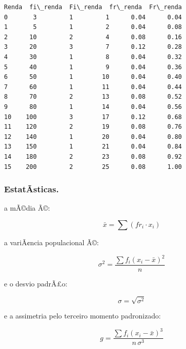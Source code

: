 ﻿\documentclass[11pt]{article}
\makeatletter
\newcommand{\boxspacing}{\kern\kvtcb@left@rule\kern\kvtcb@boxsep}
\newcommand{\prompt}[4]{
        {\ttfamily\llap{{\color{#2}[#3]:\hspace{3pt}#4}}\vspace{-\baselineskip}}
    }
\makeatother
\begin{document}
            \begin{tcolorbox}[breakable, size=fbox, boxrule=.5pt, pad at break*=1mm, opacityfill=0]
\prompt{Out}{outcolor}{20}{\boxspacing}
\begin{Verbatim}[commandchars=\\\{\}]
    Renda  fi\_renda  Fi\_renda  fr\_renda  Fr\_renda
0       3         1         1      0.04      0.04
1       5         1         2      0.04      0.08
2      10         2         4      0.08      0.16
3      20         3         7      0.12      0.28
4      30         1         8      0.04      0.32
5      40         1         9      0.04      0.36
6      50         1        10      0.04      0.40
7      60         1        11      0.04      0.44
8      70         2        13      0.08      0.52
9      80         1        14      0.04      0.56
10    100         3        17      0.12      0.68
11    120         2        19      0.08      0.76
12    140         1        20      0.04      0.80
13    150         1        21      0.04      0.84
14    180         2        23      0.08      0.92
15    200         2        25      0.08      1.00
\end{Verbatim}
\end{tcolorbox}
        
    \subsubsection{EstatÃ­sticas.}\label{estatuxedsticas.}

a mÃ©dia Ã©:

\[ \bar{x} = \sum(fr_i \cdot x_i) \]

    a variÃ¢ncia populacional Ã©:

\[
\sigma^2 =
\frac{\sum f_i (x_i - \bar{x})^2}{n}
\]

e o desvio padrÃ£o:

\[
\sigma = \sqrt{\sigma^2}
\]

e a assimetria pelo terceiro momento padronizado:

\[
g =
\frac{\sum f_i (x_i - \bar{x})^3}
{n\,\sigma^3}
\]
\end{document}
